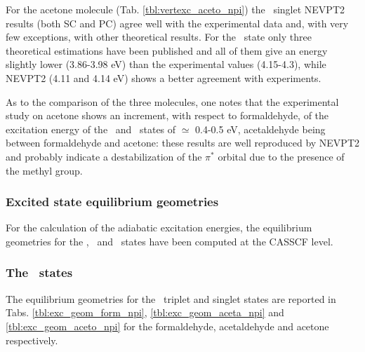 For the acetone molecule (Tab. \ref{tbl:vertexc_aceto_npi}) the \npi\
singlet NEVPT2 results (both SC and PC) agree well with the experimental
data and, with very few exceptions, with other theoretical results.  For the
\tnpi\ state only three theoretical estimations have been published and all
of them give an energy slightly lower (3.86-3.98 eV) than the experimental
values (4.15-4.3), while NEVPT2 (4.11 and  4.14 eV) shows a better agreement
with experiments.

As to the comparison of the three molecules, one notes that the experimental
study on acetone shows an increment, with respect to formaldehyde, of the
excitation energy of the \snpi\ and \tnpi\ states of $\simeq$ 0.4-0.5 eV,
acetaldehyde being between formaldehyde and acetone: these results are well
reproduced  by NEVPT2 and probably indicate a destabilization of the $\pi^*$
orbital due to the presence of the methyl group. 




\newpage
\subsubsection*{Excited state equilibrium geometries}
For the calculation of the adiabatic excitation energies, the equilibrium
geometries for the \npi, \pipi\ and  \spi\ states have been computed at the
CASSCF level. 


\subsubsection*{The \npi\ states}
The equilibrium geometries for the \npi\ triplet and singlet states are
reported in Tabs. \ref{tbl:exc_geom_form_npi}, \ref{tbl:exc_geom_aceta_npi}
and \ref{tbl:exc_geom_aceto_npi} for the formaldehyde, acetaldehyde and
acetone respectively. 



